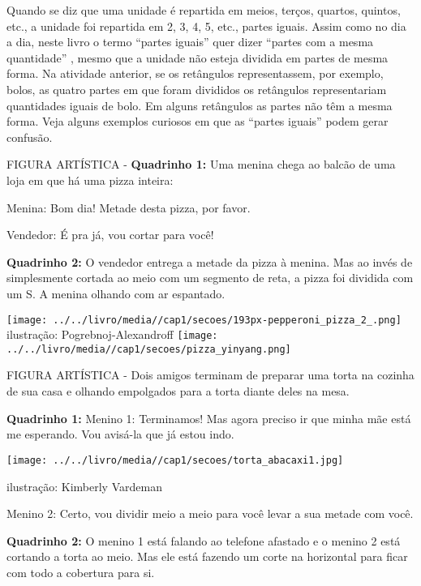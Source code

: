 \documentclass[a4,12pt]{book}
\begin{document}
\begin{refletindo*}[breakable]{}{}  
  Quando se diz que uma unidade é repartida em meios, terços, quartos, quintos, etc., a unidade foi repartida em 2, 3, 4, 5, etc., partes iguais.  
  Assim como no dia a dia, neste livro o termo   ``partes iguais''   quer dizer   ``partes com a mesma quantidade''  , mesmo que a unidade não esteja dividida em partes de mesma forma.  
  Na atividade anterior, se os retângulos representassem, por exemplo, bolos, as quatro partes em que foram divididos os retângulos representariam quantidades iguais de bolo.   
  Em alguns retângulos as partes não têm a mesma forma.  
  Veja alguns exemplos curiosos em que as   ``partes iguais''   podem gerar confusão.  
  
  \begin{imagem*}[breakable]{}{}     FIGURA ARTÍSTICA    -   
    {\bf Quadrinho 1:}     Uma menina chega ao balcão de uma loja em que há uma pizza inteira:     
    
    Menina: Bom dia! Metade desta pizza, por favor.     
    
    Vendedor: É pra já, vou cortar para você!    
        
    {\bf Quadrinho 2:}     O vendedor entrega a metade da pizza à menina. Mas ao invés de simplesmente cortada ao meio com um segmento de reta, a pizza foi dividida com um S. A menina olhando com ar espantado.     
            
            \texttt{[image: ../../livro/media//cap1/secoes/193px-pepperoni\_pizza\_2\_.png]}    
    ilustração: Pogrebnoj-Alexandroff
        \texttt{[image: ../../livro/media//cap1/secoes/pizza\_yinyang.png]}    
  \end{imagem*}  
  
  \begin{imagem*}[breakable]{}{}     FIGURA ARTÍSTICA   -     Dois amigos terminam de preparar uma torta na cozinha de sua casa e olhando empolgados para a torta diante deles na mesa.    
    
    {\bf Quadrinho 1:}  Menino 1:  Terminamos! Mas agora preciso ir que minha mãe está me esperando. Vou avisá-la que já estou indo.    
    
        \texttt{[image: ../../livro/media//cap1/secoes/torta\_abacaxi1.jpg]}    
    
    ilustração: Kimberly Vardeman    
    
    Menino 2: Certo, vou dividir meio a meio para você levar a sua metade com você.    
    
    {\bf Quadrinho 2:}    
    O menino 1 está falando ao telefone afastado e o menino 2 está cortando a torta ao meio. Mas ele está fazendo um corte na horizontal para ficar com todo a cobertura para si.    
  \end{imagem*}  
\end{refletindo*}
\end{document}
